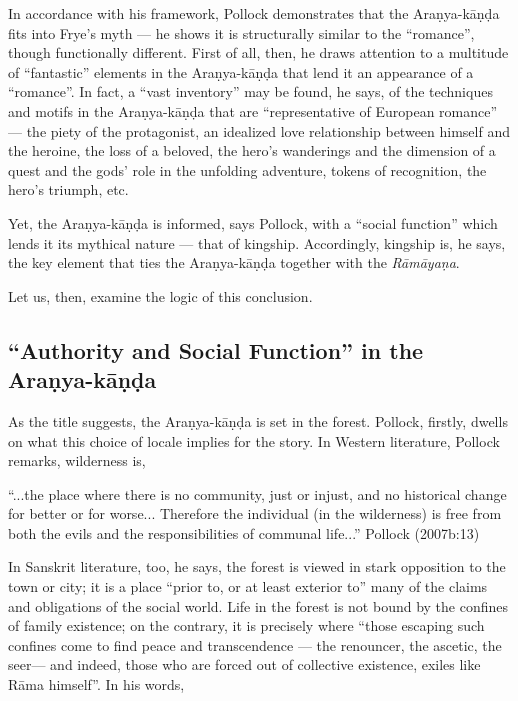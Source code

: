 In accordance with his framework, Pollock demonstrates that the Araṇya-kāṇḍa fits into Frye’s myth --- he shows it is structurally similar to the “romance”, though functionally different. First of all, then, he draws attention to a multitude of “fantastic” elements in the Araṇya-kāṇḍa that lend it an appearance of a “romance”. In fact, a “vast inventory” may be found, he says, of the techniques and motifs in the Araṇya-kāṇḍa that are “representative of European romance” --- the piety of the protagonist, an idealized love relationship between himself and the heroine, the loss of a beloved, the hero’s wanderings and the dimension of a quest and the gods’ role in the unfolding adventure, tokens of recognition, the hero’s triumph, etc.  

Yet, the Araṇya-kāṇḍa is informed, says Pollock, with a “social function” which lends it its mythical nature --- that of kingship. Accordingly, kingship is, he says, the key element that ties the Araṇya-kāṇḍa together with the {\sl Rāmāyaṇa}. 

Let us, then, examine the logic of this conclusion. 

\subsection{“Authority and Social Function” in the Araṇya-kāṇḍa}\label{sec2.3.1}

As the title suggests, the Araṇya-kāṇḍa is set in the forest. Pollock, firstly, dwells on what this choice of locale implies for the story. In Western literature, Pollock remarks, wilderness is, 

\begin{myquote}
“...the place where there is no community, just or injust, and no historical change for better or for worse... Therefore the individual (in the wilderness) is free from both the evils and the responsibilities of communal life...”
\hfill Pollock (2007b:13)
\end{myquote}

In Sanskrit literature, too, he says, the forest is viewed in stark opposition to the town or city; it is a place “prior to, or at least exterior to” many of the claims and obligations of the social world. Life in the forest is not bound by the confines of family existence; on the contrary, it is precisely where “those escaping such confines come to find peace and transcendence --- the renouncer, the ascetic, the seer--- and indeed, those who are forced out of collective existence, exiles like Rāma himself”. In his words,

